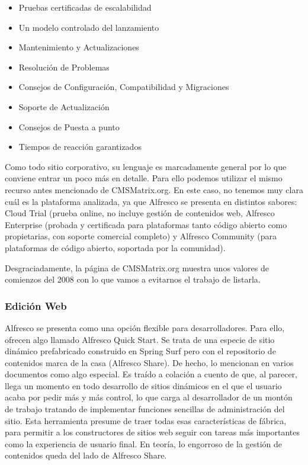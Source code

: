 \begin{itemize}
\item Pruebas certificadas de escalabilidad
\item Un modelo controlado del lanzamiento
\item Mantenimiento y Actualizaciones
\item Resolución de Problemas
\item Consejos de Configuración, Compatibilidad y Migraciones
\item Soporte de Actualización
\item Consejos de Puesta a punto
\item Tiempos de reacción garantizados
\end{itemize}

\par Como todo sitio corporativo, su lenguaje es marcadamente general por lo que conviene entrar un poco más en detalle. Para ello podemos utilizar el mismo recurso antes mencionado de CMSMatrix.org\cite{references:cmsmatrix}. En este caso, no tenemos muy clara cuál es la plataforma analizada, ya que Alfresco se presenta en distintos sabores\cite{references:alfrescocomp}: Cloud Trial (prueba online, no incluye gestión de contenidos web, Alfresco Enterprise (probada y certificada para plataformas tanto código abierto como propietarias, con soporte comercial completo) y Alfresco Community (para plataformas de código abierto, soportada por la comunidad).

\par Desgraciadamente, la página de CMSMatrix.org muestra unos valores de comienzos del 2008 con lo que vamos a evitarnos el trabajo de listarla.


\subsubsection{Edición Web}

\par Alfresco se presenta como una opción flexible para desarrolladores. Para ello, ofrecen algo llamado Alfresco Quick Start. Se trata de una especie de sitio dinámico prefabricado construido en Spring Surf pero con el repositorio de contenidos marca de la casa (Alfresco Share). De hecho, lo mencionan en varios documentos como algo especial. Es traído a colación a cuento de que, al parecer, llega un momento en todo desarrollo de sitios dinámicos en el que el usuario acaba por pedir más y más control, lo que carga al desarrollador de un montón de trabajo tratando de implementar funciones sencillas de administración del sitio. Esta herramienta presume de traer todas esas características de fábrica, para permitir a los constructores de sitios web seguir con tareas más importantes como la experiencia de usuario final. En teoría, lo engorroso de la gestión de contenidos queda del lado de Alfresco Share.

